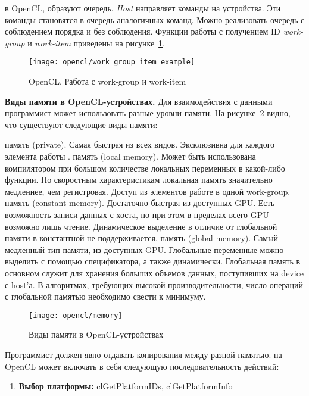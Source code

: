 {	 в OpenCL, образуют очередь. \textit{Host} направляет команды на устройства. Эти команды становятся в очередь аналогичных команд. Можно реализовать очередь с соблюдением порядка и без соблюдения.
	Функции работы с получением ID \textit{work-group} и \textit{work-item} приведены на рисунке~\ref{OpenCLWorkGroupItemExample:image}.
	\begin{figure}[H]
		\texttt{[image: opencl/work\_group\_item\_example]}
		\caption{OpenCL. Работа с work-group и work-item}
		\label{OpenCLWorkGroupItemExample:image}
	\end{figure}
	\par\textbf{Виды памяти в OpenCL-устройствах.} Для взаимодействия с данными программист может использовать разные уровни памяти. На рисунке~\ref{OpenCLMemory:image} видно, что существуют следующие виды памяти:
	\begin{itemize}
		 память (private). Самая быстрая из всех видов. Эксклюзивна для каждого элемента работы \cite{Bastrakov2011}.
		 память (local memory). Может быть использована компилятором при большом количестве локальных переменных в какой-либо функции. По скоростным характеристикам локальная память значительно медленнее, чем регистровая. Доступ из элементов работе в одной work-group.
		 память (constant memory). Достаточно быстрая из доступных GPU. Есть возможность записи данных с хоста, но при этом в пределах всего GPU возможно лишь чтение. Динамическое выделение в отличие от глобальной памяти в константной не поддерживается.
		 память (global memory). Самый медленный тип памяти, из доступных GPU. Глобальные переменные можно выделить с помощью спецификатора, а также динамически. Глобальная память в основном служит для хранения больших объемов данных, поступивших на device с host’а. В алгоритмах, требующих высокой производительности, число операций с глобальной памятью необходимо свести к минимуму.
	\end{itemize}	
	\begin{figure}[H]
		\texttt{[image: opencl/memory]}
		\caption{Виды памяти в OpenCL-устройствах}
		\label{OpenCLMemory:image}
	\end{figure}
	Программист должен явно отдавать копирования между разной памятью.
	 на OpenCL может включать в себя следующую последовательность действий:
		\begin{enumerate}
			\item\textbf{Выбор платформы:} clGetPlatformIDs, clGetPlatformInfo

\end{enumerate}}
